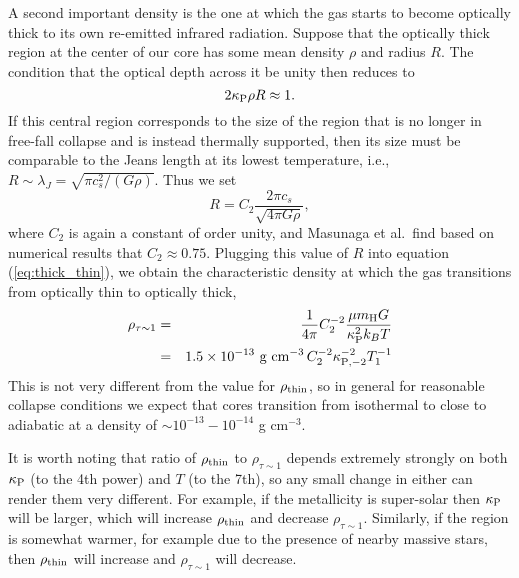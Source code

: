 A second important density is the one at which the gas starts to become optically thick to its own re-emitted infrared radiation. Suppose that the optically thick region at the center of our core has some mean density $\rho$ and radius $R$. The condition that the optical depth across it be unity then reduces to
\begin{equation}
\label{eq:thick_thin}
2 \kappa_{\rm P} \rho R \approx 1.
\end{equation}
If this central region corresponds to the size of the region that is no longer in free-fall collapse and is instead thermally supported, then its size must be comparable to the Jeans length at its lowest temperature, i.e., $R\sim \lambda_J = \sqrt{\pi c_s^2/(G\rho)}$. Thus we set
\begin{equation}
R = C_2 \frac{2\pi c_s}{\sqrt{4\pi G \rho}},
\end{equation}
where $C_2$ is again a constant of order unity, and Masunaga et al.\ find based on numerical results that $C_2\approx 0.75$. Plugging this value of $R$ into equation (\ref{eq:thick_thin}), we obtain the characteristic density at which the gas transitions from optically thin to optically thick,
\begin{eqnarray}
\rho_{\tau\sim 1} & = & \frac{1}{4\pi} C_2^{-2} \frac{\mu m_{\rm H} G}{\kappa_{\rm P}^2 k_B T} \\
& = & 
1.5\times 10^{-13}\mbox{ g cm}^{-3}\,  C_2^{-2} \kappa_{\rm P,-2}^{-2} T_1^{-1}
\end{eqnarray}
This is not very different from the value for $\rho_{\rm thin}$, so in general for reasonable collapse conditions we expect that cores transition from isothermal to close to adiabatic at a density of $\sim 10^{-13}-10^{-14}$ g cm$^{-3}$.

It is worth noting that ratio of $\rho_{\rm thin}$ to $\rho_{\tau\sim 1}$ depends extremely strongly on both $\kappa_{\rm P}$ (to the 4th power) and $T$ (to the 7th), so any small change in either can render them very different. For example, if the metallicity is super-solar then $\kappa_{\rm P}$ will be larger, which will increase $\rho_{\rm thin}$ and decrease $\rho_{\tau\sim 1}$.
Similarly, if the region is somewhat warmer, for example due to the presence of nearby massive stars, then $\rho_{\rm thin}$ will increase and $\rho_{\tau\sim 1}$ will decrease.

